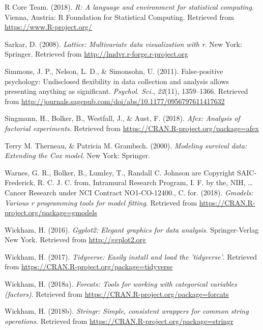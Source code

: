 \documentclass[english,man]{apa6}
\theoremstyle{definition}
\theoremstyle{definition}
\theoremstyle{definition}
\theoremstyle{remark}
\begin{document}
\hypertarget{ref-R-base}{}
R Core Team. (2018). \emph{R: A language and environment for statistical
computing}. Vienna, Austria: R Foundation for Statistical Computing.
Retrieved from \url{https://www.R-project.org/}

\hypertarget{ref-R-lattice}{}
Sarkar, D. (2008). \emph{Lattice: Multivariate data visualization with
r}. New York: Springer. Retrieved from
\url{http://lmdvr.r-forge.r-project.org}

\hypertarget{ref-Simmons2011-za}{}
Simmons, J. P., Nelson, L. D., \& Simonsohn, U. (2011). False-positive
psychology: Undisclosed flexibility in data collection and analysis
allows presenting anything as significant. \emph{Psychol. Sci.},
\emph{22}(11), 1359--1366. Retrieved from
\url{http://journals.sagepub.com/doi/abs/10.1177/0956797611417632}

\hypertarget{ref-R-afex}{}
Singmann, H., Bolker, B., Westfall, J., \& Aust, F. (2018). \emph{Afex:
Analysis of factorial experiments}. Retrieved from
\url{https://CRAN.R-project.org/package=afex}

\hypertarget{ref-R-survival-book}{}
Terry M. Therneau, \& Patricia M. Grambsch. (2000). \emph{Modeling
survival data: Extending the Cox model}. New York: Springer.

\hypertarget{ref-R-gmodels}{}
Warnes, G. R., Bolker, B., Lumley, T., Randall C. Johnson are Copyright
SAIC-Frederick, R. C. J. C. from, Intramural Research Program, I. F. by
the, NIH, \ldots{} Cancer Research under NCI Contract NO1-CO-12400., C.
for. (2018). \emph{Gmodels: Various r programming tools for model
fitting}. Retrieved from
\url{https://CRAN.R-project.org/package=gmodels}

\hypertarget{ref-R-ggplot2}{}
Wickham, H. (2016). \emph{Ggplot2: Elegant graphics for data analysis}.
Springer-Verlag New York. Retrieved from \url{http://ggplot2.org}

\hypertarget{ref-R-tidyverse}{}
Wickham, H. (2017). \emph{Tidyverse: Easily install and load the
'tidyverse'}. Retrieved from
\url{https://CRAN.R-project.org/package=tidyverse}

\hypertarget{ref-R-forcats}{}
Wickham, H. (2018a). \emph{Forcats: Tools for working with categorical
variables (factors)}. Retrieved from
\url{https://CRAN.R-project.org/package=forcats}

\hypertarget{ref-R-stringr}{}
Wickham, H. (2018b). \emph{Stringr: Simple, consistent wrappers for
common string operations}. Retrieved from
\url{https://CRAN.R-project.org/package=stringr}
\end{document}
